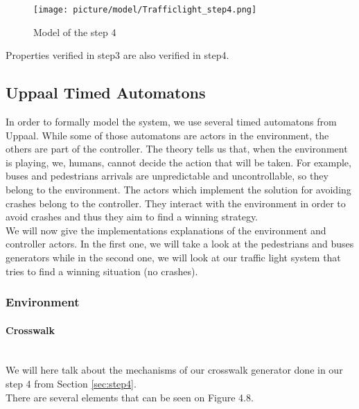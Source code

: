\begin{figure}[H]\label{fig:step4}
  \centering
    \texttt{[image: picture/model/Trafficlight\_step4.png]}
    \caption{Model of the step 4}
\end{figure}

Properties verified in step3 are also verified in step4.

\subsection{Uppaal Timed Automatons}
In order to formally model the system, we use several timed automatons from Uppaal. While some of those automatons are actors in the environment, the others are part of the controller.
The theory tells us that, when the environment is playing, we, humans, cannot decide the action that will be taken. For example, buses and pedestrians arrivals are unpredictable and uncontrollable, so they belong to the environment.
The actors which implement the solution for avoiding crashes belong to the controller. They interact with the environment in order to avoid crashes and thus they aim to find a winning strategy. \\
We will now give the implementations explanations of the environment and controller actors. In the first one, we will take a look at the pedestrians and buses generators while in the second one, we will look at our traffic light system that tries to find a winning situation (no crashes).

\subsubsection{Environment}
\paragraph{Crosswalk} \mbox{}\\
We will here talk about the mechanisms of our crosswalk generator done in our step 4 from Section \ref{sec:step4}. \\
There are several elements that can be seen on Figure 4.8.


